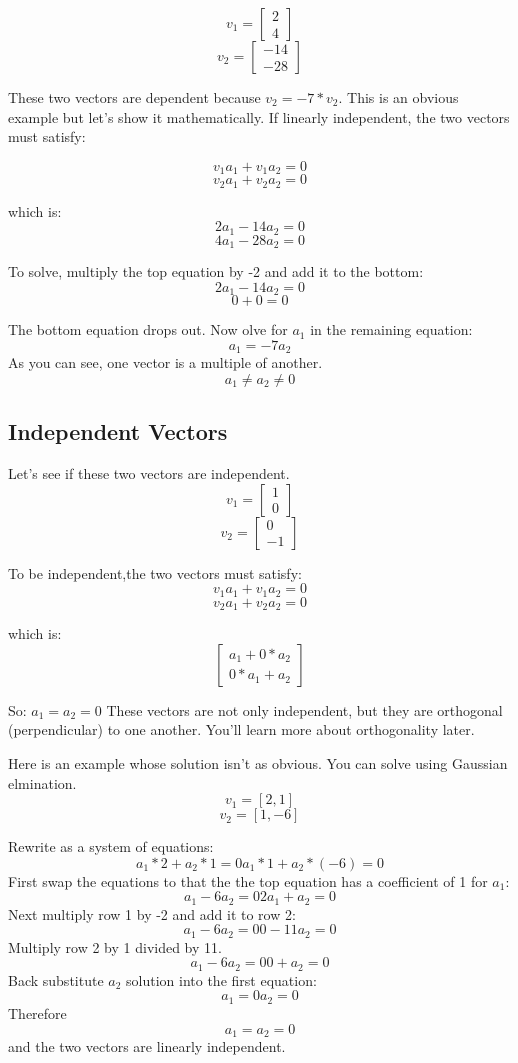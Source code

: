 $$v_1 = \begin{bmatrix}
			2 \\
			4
		\end{bmatrix}$$
$$v_2 = \begin{bmatrix}
			-14 \\
			-28
\end{bmatrix}$$

These two vectors are dependent because $v_2 = -7*v_2$. This is an obvious example but let's show it mathematically. If linearly independent, the two vectors must satisfy:

	$$v_1a_1 + v_1a_2 = 0$$
	$$v_2a_1 + v_2a_2 = 0$$

which is:
	$$2a_1 -14a_2 = 0$$
	$$4a_1 -28a_2 = 0$$

To solve, multiply the top equation by -2 and add it to the bottom: 
$$2a_1 -14a_2 = 0 $$
$$ 0  + 0     = 0 $$

The bottom equation drops out. Now  olve for $a_1$ in the remaining equation:
$$a_1 = -7a_2$$
As you can see, one vector is a multiple of another. $$a_1 \neq a_2 \neq 0$$

\subsection{Independent Vectors}
Let's see if these two vectors are independent.
$$v_1 = \begin{bmatrix}
1 \\
0
\end{bmatrix}$$
$$v_2 = \begin{bmatrix}
0 \\
-1
\end{bmatrix}$$

To be independent,the two vectors must satisfy:
	$$v_1a_1 + v_1a_2 = 0$$
	$$v_2a_1 + v_2a_2 = 0$$
	
which is:
$$\begin{bmatrix}
	a_1 + 0*a_2 \\
	0*a_1 + a_2
\end{bmatrix}$$

So:
$a_1 = a_2 = 0$
These vectors are not only independent, but they are orthogonal (perpendicular) to one another. You'll learn more about orthogonality later.

Here is an example whose solution isn't as obvious. You can solve using Gaussian elmination.
$$v_1 = [2,1]$$
$$v_2 = [1,-6]$$

Rewrite as a system of equations:
$$
	a_1*2 + a_2*1 = 0 
	a_1*1 + a_2*(-6) = 0
$$
First swap the equations to that the the top equation has a coefficient of 1 for $a_1$:
$$
	a_1 - 6a_2 = 0 
	2a_1 + a_2 = 0 
$$
Next multiply row 1 by -2 and add it to row 2:
$$
	a_1 - 6a_2 = 0 
	0  - 11a_2 = 0 
$$
Multiply row 2 by 1 divided by 11.
$$
	a_1 - 6a_2 = 0 
	0  +  a_2 = 0 
$$
Back substitute $a_2$ solution into the first equation:
$$
	a_1  = 0 
	a_2 = 0 
$$
Therefore $$a_1 = a_2 = 0$$ and the two vectors are linearly independent.


